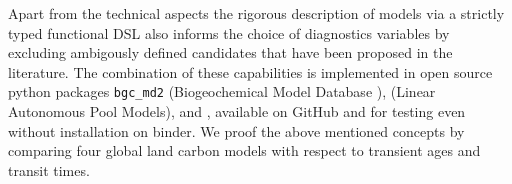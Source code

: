 Apart from the technical aspects the rigorous description of models via a
strictly typed functional DSL also informs the choice of diagnostics variables by
excluding ambigously defined candidates that have been proposed in the literature. 
The combination of these capabilities is implemented in open source python
packages \texttt{bgc\_md2} (Biogeochemical Model Database ), 
\LAPM (Linear Autonomous Pool Models),
\CompartmentalSystems and \ComputabilityGraphs, available on GitHub and for testing even without installation on binder. 
We proof the above mentioned concepts by comparing four global land carbon models with respect to transient ages and transit times.
